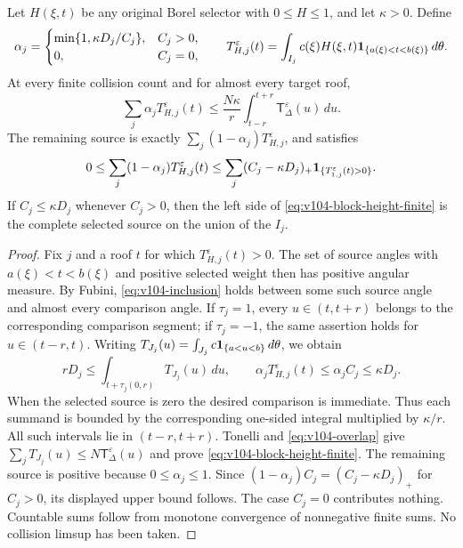 \begin{theorem}
\label{thm:v104-block}
Let $H(\xi,t)$ be any original Borel selector with $0\le H\le1$,
and let $\kappa>0$. Define
\[
 \alpha_j=\begin{cases}
 \min\{1,\kappa D_j/C_j\},&C_j>0,\\
 0,&C_j=0,
 \end{cases}
 \qquad
 T_{H,j}^\varepsilon(t)=\int_{I_j}c(\xi)H(\xi,t)
                         \mathbf1_{\{a(\xi)<t<b(\xi)\}}\,d\theta.
\]
At every finite collision count and for almost every target roof,
\begin{equation}\label{eq:v104-block-height-finite}
 \sum_j\alpha_j T_{H,j}^\varepsilon(t)
 \le\frac{N\kappa}{r}\int_{t-r}^{t+r}
                          \mathsf T_\Delta^\varepsilon(u)\,du.
\end{equation}
The remaining source is exactly
$\sum_j(1-\alpha_j)T_{H,j}^\varepsilon$, and satisfies
\begin{equation}\label{eq:v104-deficit}
 0\le\sum_j(1-\alpha_j)T_{H,j}^\varepsilon(t)
 \le\sum_j(C_j-\kappa D_j)_+
        \one_{\{T_{1,j}^\varepsilon(t)>0\}}.
\end{equation}
If $C_j\le\kappa D_j$ whenever $C_j>0$, then the left side of
\eqref{eq:v104-block-height-finite} is the complete selected source
on the union of the $I_j$.
\end{theorem}
\begin{proof}
Fix $j$ and a roof $t$ for which $T_{H,j}^\varepsilon(t)>0$.
The set of source angles with $a(\xi)<t<b(\xi)$ and positive
selected weight then has positive angular measure. By Fubini,
\eqref{eq:v104-inclusion} holds between some such source angle
and almost every comparison angle. If $\tau_j=1$, every
$u\in(t,t+r)$ belongs to the corresponding comparison segment;
if $\tau_j=-1$, the same assertion holds for $u\in(t-r,t)$.
Writing $T_{J_j}(u)=\int_{J_j}c\mathbf1_{\{a<u<b\}}\,d\theta$, we obtain
\[
 rD_j\le\int_{t+\tau_j(0,r)}T_{J_j}(u)\,du,
 \qquad
 \alpha_j T_{H,j}^\varepsilon(t)\le\alpha_j C_j\le\kappa D_j.
\]
When the selected source is zero the desired comparison is immediate.
Thus each summand is bounded by the corresponding one-sided integral
multiplied by $\kappa/r$. All such intervals lie in $(t-r,t+r)$.
Tonelli and \eqref{eq:v104-overlap} give
$\sum_jT_{J_j}(u)\le N\mathsf T_\Delta^\varepsilon(u)$ and prove
\eqref{eq:v104-block-height-finite}. The remaining source is positive
because $0\le\alpha_j\le1$. Since
$(1-\alpha_j)C_j=(C_j-\kappa D_j)_+$ for $C_j>0$, its displayed
upper bound follows. The case $C_j=0$ contributes nothing.
Countable sums follow from monotone convergence of nonnegative finite
sums. No collision limsup has been taken.
\end{proof}

